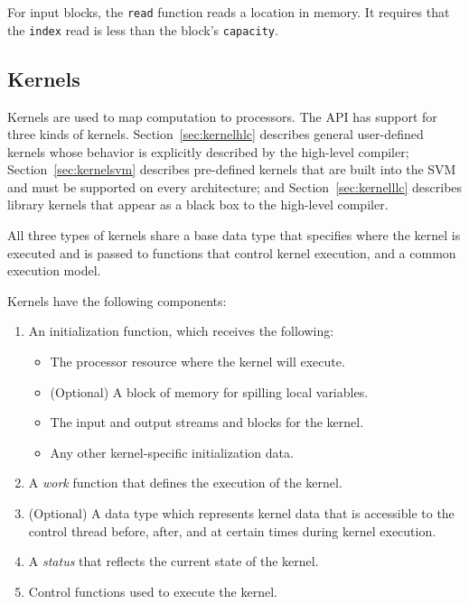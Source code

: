  For input blocks, the {\tt read} function reads a
location in memory.  It requires that the {\tt index} read is less
than the block's {\tt capacity}.

\subsection{Kernels}
\label{sec:kernel}

Kernels are used to map computation to processors.  The API has
support for three kinds of kernels. Section~\ref{sec:kernelhlc}
describes general user-defined kernels whose behavior is explicitly
described by the high-level compiler; Section~\ref{sec:kernelsvm}
describes pre-defined kernels that are built into the SVM and must be
supported on every architecture; and Section~\ref{sec:kernelllc}
describes library kernels that appear as a black box to the high-level
compiler.

All three types of kernels share a base data type that specifies where
the kernel is executed and is passed to functions that control kernel
execution, and a common execution model.

Kernels have the following components:

\begin{enumerate}

\item An initialization function, which receives the following: 
\begin{itemize}
\item The processor resource where the kernel will execute. 
\item (Optional) A block of memory for spilling local variables. 
\item The input and output streams and blocks for the kernel. 
\item Any other kernel-specific initialization data. 
\end{itemize}

\item A {\it work} function that defines the execution of the kernel.

\item (Optional) A data type which represents kernel data that is
accessible to the control thread before, after, and at certain times
during kernel execution.

\item A {\it status} that reflects the current state of the kernel.

\item Control functions used to execute the kernel.

\end{enumerate}

